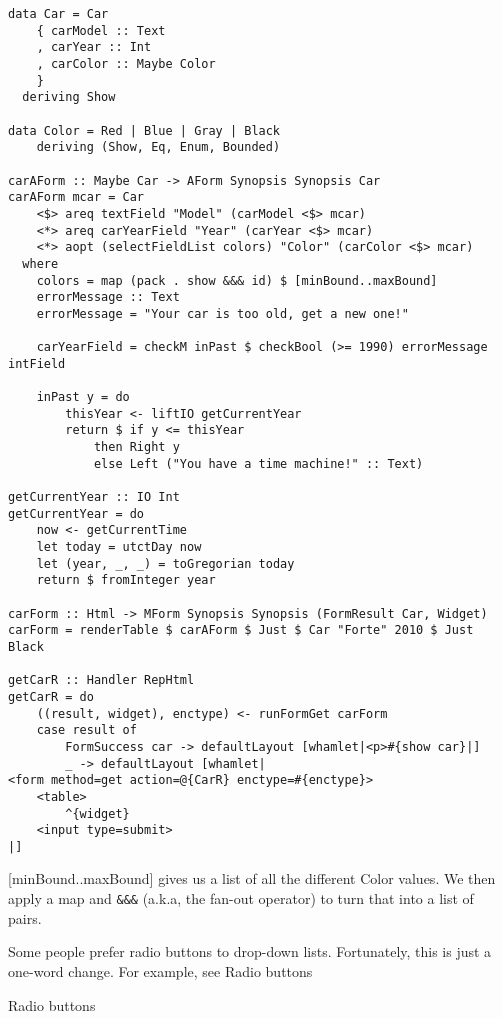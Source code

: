 \begin{lstlisting}
data Car = Car
    { carModel :: Text
    , carYear :: Int
    , carColor :: Maybe Color
    }
  deriving Show

data Color = Red | Blue | Gray | Black
    deriving (Show, Eq, Enum, Bounded)

carAForm :: Maybe Car -> AForm Synopsis Synopsis Car
carAForm mcar = Car
    <$> areq textField "Model" (carModel <$> mcar)
    <*> areq carYearField "Year" (carYear <$> mcar)
    <*> aopt (selectFieldList colors) "Color" (carColor <$> mcar)
  where
    colors = map (pack . show &&& id) $ [minBound..maxBound]
    errorMessage :: Text
    errorMessage = "Your car is too old, get a new one!"

    carYearField = checkM inPast $ checkBool (>= 1990) errorMessage intField

    inPast y = do
        thisYear <- liftIO getCurrentYear
        return $ if y <= thisYear
            then Right y
            else Left ("You have a time machine!" :: Text)

getCurrentYear :: IO Int
getCurrentYear = do
    now <- getCurrentTime
    let today = utctDay now
    let (year, _, _) = toGregorian today
    return $ fromInteger year

carForm :: Html -> MForm Synopsis Synopsis (FormResult Car, Widget)
carForm = renderTable $ carAForm $ Just $ Car "Forte" 2010 $ Just Black

getCarR :: Handler RepHtml
getCarR = do
    ((result, widget), enctype) <- runFormGet carForm
    case result of
        FormSuccess car -> defaultLayout [whamlet|<p>#{show car}|]
        _ -> defaultLayout [whamlet|
<form method=get action=@{CarR} enctype=#{enctype}>
    <table>
        ^{widget}
    <input type=submit>
|]
\end{lstlisting}

[minBound..maxBound] gives us a list of all the different Color values. We then apply a map and \lstinline'&&&' (a.k.a, the fan-out operator) to turn that into a list of pairs.

Some people prefer radio buttons to drop-down lists. Fortunately, this is just a one-word change. For example, see Radio buttons

Radio buttons

